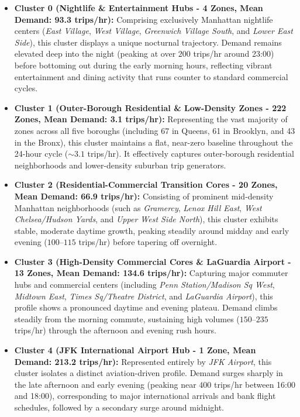 \documentclass[11pt,a4paper]{article}
\begin{document}
\begin{itemize}
    \item \textbf{Cluster 0 (Nightlife \& Entertainment Hubs - 4 Zones, Mean Demand: 93.3 trips/hr):} 
    Comprising exclusively Manhattan nightlife centers (\textit{East Village}, \textit{West Village}, \textit{Greenwich Village South}, and \textit{Lower East Side}), this cluster displays a unique nocturnal trajectory. Demand remains elevated deep into the night (peaking at over $200$ trips/hr around 23:00) before bottoming out during the early morning hours, reflecting vibrant entertainment and dining activity that runs counter to standard commercial cycles.
    
    \item \textbf{Cluster 1 (Outer-Borough Residential \& Low-Density Zones - 222 Zones, Mean Demand: 3.1 trips/hr):} 
    Representing the vast majority of zones across all five boroughs (including 67 in Queens, 61 in Brooklyn, and 43 in the Bronx), this cluster maintains a flat, near-zero baseline throughout the 24-hour cycle ($\sim 3.1$ trips/hr). It effectively captures outer-borough residential neighborhoods and lower-density suburban trip generators.
    
    \item \textbf{Cluster 2 (Residential-Commercial Transition Cores - 20 Zones, Mean Demand: 66.9 trips/hr):} 
    Consisting of prominent mid-density Manhattan neighborhoods (such as \textit{Gramercy}, \textit{Lenox Hill East}, \textit{West Chelsea/Hudson Yards}, and \textit{Upper West Side North}), this cluster exhibits stable, moderate daytime growth, peaking steadily around midday and early evening ($100$--$115$ trips/hr) before tapering off overnight.
    
    \item \textbf{Cluster 3 (High-Density Commercial Cores \& LaGuardia Airport - 13 Zones, Mean Demand: 134.6 trips/hr):} 
    Capturing major commuter hubs and commercial centers (including \textit{Penn Station/Madison Sq West}, \textit{Midtown East}, \textit{Times Sq/Theatre District}, and \textit{LaGuardia Airport}), this profile shows a pronounced daytime and evening plateau. Demand climbs steadily from the morning commute, sustaining high volumes ($150$--$235$ trips/hr) through the afternoon and evening rush hours.
    
    \item \textbf{Cluster 4 (JFK International Airport Hub - 1 Zone, Mean Demand: 213.2 trips/hr):} 
    Represented entirely by \textit{JFK Airport}, this cluster isolates a distinct aviation-driven profile. Demand surges sharply in the late afternoon and early evening (peaking near $400$ trips/hr between 16:00 and 18:00), corresponding to major international arrivals and bank flight schedules, followed by a secondary surge around midnight.
    

\end{itemize}
\end{document}
